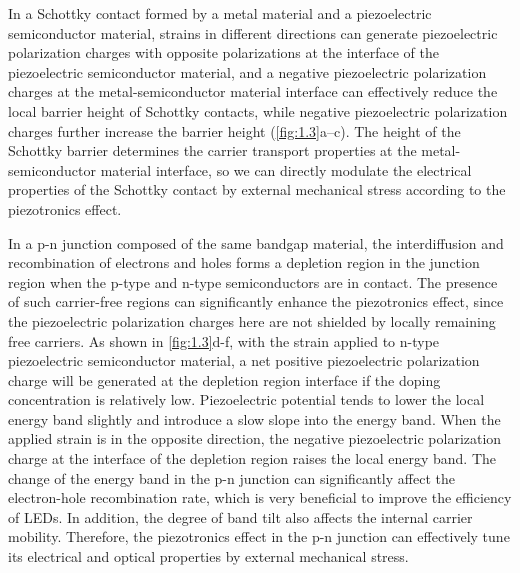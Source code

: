 In a Schottky contact  formed by a metal material and a piezoelectric semiconductor material, strains  in different directions can generate piezoelectric polarization charges  with opposite polarizations at the interface  of the piezoelectric semiconductor material, and a negative piezoelectric polarization  charges at the metal-semiconductor material interface  can effectively reduce the local barrier height of Schottky  contacts, while negative piezoelectric polarization charges  further increase the barrier height (\autoref{fig:1.3}a–c). The height of the Schottky  barrier determines the carrier transport properties at the metal-semiconductor material interface, so we can directly modulate  the electrical properties of the Schottky contact  by external mechanical stress according to the piezotronics  effect.

In a p-n junction composed of the same bandgap material, the interdiffusion and recombination of electrons and holes forms a depletion region in the junction region when the p-type and n-type semiconductors are in contact. The presence of such carrier-free regions can significantly enhance the piezotronics  effect, since the piezoelectric polarization charges  here are not shielded by locally remaining free carriers. As shown in \autoref{fig:1.3}d-f, with the strain  applied to n-type piezoelectric semiconductor material, a net positive piezoelectric polarization charge  will be generated at the depletion region interface  if the doping concentration is relatively low. Piezoelectric potential  tends to lower the local energy band  slightly and introduce a slow slope into the energy band. When the applied strain  is in the opposite direction, the negative piezoelectric polarization charge  at the interface  of the depletion region raises the local energy  band. The change of the energy band in the p-n junction can significantly affect the electron-hole recombination rate, which is very beneficial to improve the efficiency of LEDs. In addition, the degree of band tilt also affects the internal carrier mobility. Therefore, the piezotronics  effect in the p-n junction can effectively tune its electrical and optical properties by external mechanical stress.

